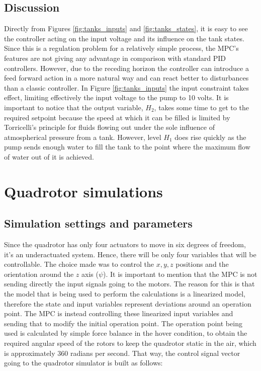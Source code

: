 \subsection{Discussion}

Directly from Figures \ref{fig:tanks_inputs} and \ref{fig:tanks_states}, it is easy to see the controller acting on the input voltage and its influence on the tank states. Since this is a regulation problem for a relatively simple process, the MPC's features are not giving any advantage in comparison with standard PID controllers. However, due to the receding horizon the controller can introduce a feed forward action in a more natural way and can react better to disturbances than a classic controller. In Figure \ref{fig:tanks_inputs} the input constraint takes effect, limiting effectively the input voltage to the pump to 10 volts. It is important to notice that the output variable, $H_2$, takes some time to get to the required setpoint because the speed at which it can be filled is limited by Torricelli's principle for fluids flowing out under the sole influence of atmospherical pressure from a tank. However, level $H_1$ does rise quickly as the pump sends enough water to fill the tank to the point where the maximum flow of water out of it is achieved. 


\section{Quadrotor simulations}

\subsection{Simulation settings and parameters}

Since the quadrotor has only four actuators to move in six degrees of freedom, it's an underactuated system. Hence, there will be only four variables that will be controllable. The choice made was to control the $x, y, z$ positions and the orientation around the $z$ axis ($\psi$). It is important to mention that the MPC is not sending directly the input signals going to the motors. The reason for this is that the model that is being used to perform the calculations is a linearized model, therefore the state and input variables represent deviations around an operation point. The MPC is instead controlling these linearized input variables and sending that to modify the initial operation point. The operation point being used is calculated by simple force balance in the hover condition, to obtain the required angular speed of the rotors to keep the quadrotor static in the air, which is approximately $360$ radians per second. That way, the control signal vector going to the quadrotor simulator is built as follows:

